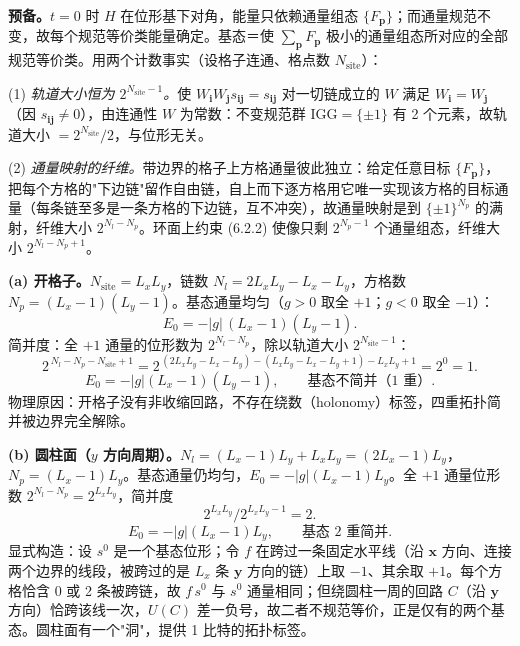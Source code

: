 \textbf{预备。}$t=0$ 时 $H$ 在位形基下对角，能量只依赖通量组态 $\{F_{\pmb p}\}$；而通量规范不变，故每个规范等价类能量确定。基态＝使 $\sum_{\pmb p}F_{\pmb p}$ 极小的通量组态所对应的全部规范等价类。用两个计数事实（设格子连通、格点数 $N_{\text{site}}$）：

(1) \emph{轨道大小恒为 $2^{N_{\text{site}}-1}$。}使 $W_{\pmb i}W_{\pmb j}s_{\pmb{ij}}=s_{\pmb{ij}}$ 对一切链成立的 $W$ 满足 $W_{\pmb i}=W_{\pmb j}$（因 $s_{\pmb{ij}}\neq0$），由连通性 $W$ 为常数：不变规范群 $\text{IGG}=\{\pm1\}$ 有 2 个元素，故轨道大小 $=2^{N_{\text{site}}}/2$，与位形无关。

(2) \emph{通量映射的纤维。}带边界的格子上方格通量彼此独立：给定任意目标 $\{F_{\pmb p}\}$，把每个方格的"下边链"留作自由链，自上而下逐方格用它唯一实现该方格的目标通量（每条链至多是一条方格的下边链，互不冲突），故通量映射是到 $\{\pm1\}^{N_p}$ 的满射，纤维大小 $2^{N_l-N_p}$。环面上约束 (6.2.2) 使像只剩 $2^{N_p-1}$ 个通量组态，纤维大小 $2^{N_l-N_p+1}$。

\textbf{(a) 开格子。}$N_{\text{site}}=L_xL_y$，链数 $N_l=2L_xL_y-L_x-L_y$，方格数 $N_p=(L_x-1)(L_y-1)$。基态通量均匀（$g>0$ 取全 $+1$；$g<0$ 取全 $-1$）：
\begin{equation*}
E_0=-|g|\,(L_x-1)(L_y-1).
\end{equation*}
简并度：全 $+1$ 通量的位形数为 $2^{N_l-N_p}$，除以轨道大小 $2^{N_{\text{site}}-1}$：
\begin{equation*}
2^{\,N_l-N_p-N_{\text{site}}+1}
=2^{\,(2L_xL_y-L_x-L_y)-(L_xL_y-L_x-L_y+1)-L_xL_y+1}=2^{0}=1 .
\end{equation*}
\begin{equation*}
\boxed{\ E_0=-|g|(L_x-1)(L_y-1),\qquad \text{基态不简并（1 重）}.\ }
\end{equation*}
物理原因：开格子没有非收缩回路，不存在绕数（holonomy）标签，四重拓扑简并被边界完全解除。

\textbf{(b) 圆柱面（$y$ 方向周期）。}$N_l=(L_x-1)L_y+L_xL_y=(2L_x-1)L_y$，$N_p=(L_x-1)L_y$。基态通量仍均匀，$E_0=-|g|(L_x-1)L_y$。全 $+1$ 通量位形数 $2^{N_l-N_p}=2^{L_xL_y}$，简并度
\begin{equation*}
2^{L_xL_y}\big/2^{L_xL_y-1}=2 .
\end{equation*}
\begin{equation*}
\boxed{\ E_0=-|g|(L_x-1)L_y,\qquad \text{基态 2 重简并}.\ }
\end{equation*}
显式构造：设 $s^0$ 是一个基态位形；令 $f$ 在跨过一条固定水平线（沿 $\pmb x$ 方向、连接两个边界的线段，被跨过的是 $L_x$ 条 $\pmb y$ 方向的链）上取 $-1$、其余取 $+1$。每个方格恰含 0 或 2 条被跨链，故 $f\,s^0$ 与 $s^0$ 通量相同；但绕圆柱一周的回路 $C$（沿 $\pmb y$ 方向）恰跨该线一次，$U(C)$ 差一负号，故二者不规范等价，正是仅有的两个基态。圆柱面有一个"洞"，提供 1 比特的拓扑标签。

